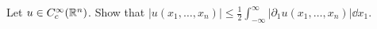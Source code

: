 Let $u \in C_c^\infty(\mathbb{R}^n)$. Show that $|u(x_1, \ldots, x_n)| \leq \frac{1}{2} \int_{-\infty}^{\infty} |\partial_1 u(x_1, \ldots, x_n)| \dd{x_1}$.
